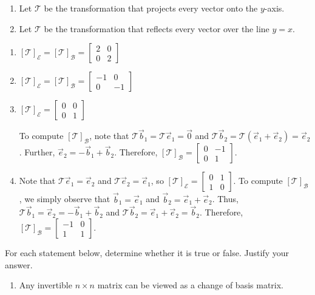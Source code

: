 \begin{exercises}
\begin{problist}
\begin{enumerate}
			\item Let $\mathcal T$ be the transformation that projects
				every vector onto the $y$-axis.

			\item Let $\mathcal T$ be the transformation that reflects
				every vector over the line $y=x$.
		\end{enumerate}
		\begin{solution}
			\begin{enumerate}
				\item 
				$[\mathcal T]_{\mathcal E}=[\mathcal T]_{\mathcal B}=
				\begin{bmatrix}
					2 & 0 \\ 0 & 2
				\end{bmatrix}$
				\item 
				$[\mathcal T]_{\mathcal E}=[\mathcal T]_{\mathcal B}=
				\begin{bmatrix}
				-1 & 0 \\ 0 & -1
				\end{bmatrix}$
				\item 
				$[\mathcal T]_{\mathcal E}=
				\begin{bmatrix}
					0 & 0 \\ 0 & 1
				\end{bmatrix}$
				
				To compute $[\mathcal T]_{\mathcal B}$, note that $\mathcal T\vec b_1=\mathcal T\vec e_1=\vec 0$
				and $\mathcal T\vec b_2=\mathcal T(\vec e_1+\vec e_2)=\vec e_2$. Further,
				$\vec e_2=-\vec b_1+\vec b_2$. Therefore, 
				$[\mathcal T]_{\mathcal B}=
				\begin{bmatrix}
					0 & -1 \\ 0 & 1
				\end{bmatrix}$.
				\item Note that $\mathcal T\vec e_1=\vec e_2$ and $\mathcal T\vec e_2=\vec e_1$, so
				$[\mathcal T]_{\mathcal E}=
				\begin{bmatrix}
					0 & 1 \\ 1 & 0
				\end{bmatrix}$.
				To compute $[\mathcal T]_{\mathcal B}$, we simply observe that $\vec b_1=\vec e_1$
				and $\vec b_2=\vec e_1+\vec e_2$. Thus, $\mathcal T\vec b_1=\vec e_2=-\vec b_1+\vec b_2$
				and $\mathcal T\vec b_2=\vec e_1+\vec e_2=\vec b_2$. Therefore, 
				$[\mathcal T]_{\mathcal B}=
				\begin{bmatrix}
					-1 & 0 \\ 1 & 1
				\end{bmatrix}$.
			\end{enumerate}
		\end{solution}
		\prob For each statement below, determine whether it is true or false. Justify your answer.
		\begin{enumerate}
			\item Any invertible $n \times n$ matrix can be viewed as
				a change of basis matrix.


\end{enumerate}
\end{problist}
\end{exercises}
